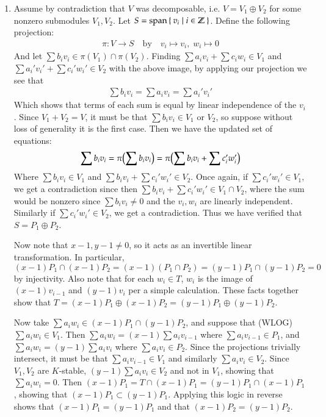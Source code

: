 \documentclass[12pt]{article}
\theoremstyle{definitionstyle}
\def\mbb#1{\mathbb{#1}}
\newcommand{\Z}{\mbb Z}
\begin{document}
\begin{enumerate}
		\item Assume by contradiction that $V$ was decomposable, i.e. $V = V_1 \oplus V_2$ for some nonzero submodules $V_1, V_2$. Let $S = \mathrm{span}\Set{v_i \mid i \in \Z}$. Define the following projection:
		\begin{align*}
			\pi: V \to S \quad \text{by} \quad v_i \mapsto v_i, \; w_i \mapsto 0
		\end{align*}
		And let $\sum b_i v_i \in \pi(V_1) \cap \pi(V_2)$. Finding $\sum a_iv_i + \sum c_iw_i \in V_1$ and $\sum a_i'v_i' + \sum c_i'w_i' \in V_2$ with the above image, by applying our projection we see that 
		\begin{align*}
			\sum b_iv_i = \sum a_iv_i = \sum a_i'v_i'
		\end{align*}
		Which shows that terms of each sum is equal by linear independence of the $v_i$. Since $V_1 + V_2 = V$, it must be that $\sum b_iv_i \in V_1$ or $V_2$, so suppose without loss of generality it is the first case. Then we have the updated set of equations:
		\begin{align*}
			\sum b_iv_i = \pi\qty(\sum b_iv_i) = \pi \qty(\sum b_iv_i + \sum c_i'w_i')
		\end{align*}
		Where $\sum b_iv_i \in V_1$ and $\sum b_iv_i + \sum c_i'w_i' \in V_2$. Once again, if $\sum c_i'w_i' \in V_1$, we get a contradiction since then $\sum b_iv_i + \sum c_i'w_i' \in V_1 \cap V_2$, where the sum would be nonzero since $\sum b_iv_i \neq 0$ and the $v_i, w_i$ are linearly independent. Similarly if $\sum c_i'w_i' \in V_2$, we get a contradiction. Thus we have verified that $S = P_1 \oplus P_2$. 

		Now note that $x-1, y-1 \neq 0$, so it acts as an invertible linear transformation. In particular, $(x-1)P_1 \cap (x-1)P_2 = (x-1)(P_1 \cap P_2) = (y-1)P_1 \cap (y-1)P_2 = 0$ by injectivity. Also note that for each $w_i \in T$, $w_i$ is the image of $(x-1)v_{i-1}$ and $(y-1)v_i$ per a simple calculation. These facts together show that $T = (x-1)P_1 \oplus (x-1)P_2 = (y-1)P_1 \oplus (y-1)P_2$.

		Now take $\sum a_iw_i \in (x-1)P_1 \cap (y-1)P_2$, and suppose that (WLOG) $\sum a_iw_i \in V_1$. Then $\sum a_iw_i = (x-1)\sum a_iv_{i-1}$ where $\sum a_iv_{i-1} \in P_1$, and $\sum a_iw_i = (y-1)\sum a_iv_i$ where $\sum a_iv_i \in P_2$. Since the projections trivially intersect, it must be that $\sum a_iv_{i-1} \in V_1$ and similarly $\sum a_iv_i \in V_2$. Since $V_1, V_2$ are $K$-stable, $(y-1)\sum a_iv_i \in V_2$ and not in $V_1$, showing that $\sum a_iw_i = 0$. Then $(x-1)P_1 = T \cap (x-1)P_1 = (y-1)P_1 \cap (x-1)P_1$, showing that $(x-1)P_1 \subset (y-1)P_1$. Applying this logic in reverse shows that $(x-1)P_1 = (y-1)P_1$ and that $(x-1)P_2 = (y-1)P_2$.


\end{enumerate}
\end{document}
